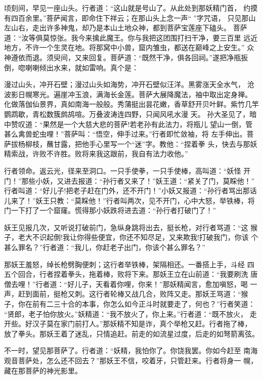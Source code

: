 顷刻间，早见一座山头。行者道：“这山就是号山了。从此处到那妖精门首，
约摸有四百余里。”菩萨闻言，即命住下祥云；在那山头上念一声“”字咒语，
只见那山左山右，走出许多神鬼，却乃是本山土地众神，都到菩萨宝莲座下磕头。
菩萨道：“汝等俱莫惊张。我今来擒此魔王。你与我把这团围打扫干净，要三百里
远近地方，不许一个生灵在地。将那窝中小兽，窟内雏虫，都送在巅峰之上安生。”
众神遵依而退。须臾间，又来回复。菩萨道：“既然干净，俱各回祠。”遂把净瓶扳
倒，唿喇喇倾出水来，就如雷响。真个是：

漫过山头，冲开石壁；漫过山头如海势，冲开石壁似汪洋。黑雾涨天全水气，
沧波影日幌寒光。遍崖冲玉浪，满海长金莲。菩萨大展降魔法，袖中取出定身禅。
化做落伽仙景界，真如南海一般般。秀蒲挺出昙花嫩，香草舒开贝叶鲜。紫竹几竿
鹦鹉歇，青松数簇鹧鸪喧。万叠波涛连四野，只闻风吼水漫
天。
孙大圣见了，暗中赞叹道：“果然是一个大慈大悲的菩萨!若老孙有此法力，将瓶儿
望山一倒，管甚么禽兽蛇虫哩！”菩萨叫：“悟空，伸手过来。”行者即忙敛袖，将
左手伸出。菩萨拔杨柳枝，蘸甘露，把他手心里写一个“迷”字。教他：“捏着拳
头，快去与那妖精索战，许败不许胜。败将来我这跟前，我自有法力收他。”

行者领命。返云光，径来至洞口。一只手使拳，一只手使棒，高叫道：“妖怪
开门！”那些小妖，又进去报道：“孙行者又来了！”妖王道：“紧关了门，莫睬他！”
行者叫道：“好儿子!把老子赶在门外，还不开门！”小妖又报道：“孙行者骂出那话
儿来了！”妖王只教：“莫睬他！”行者叫两次，见不开门，心中大怒，举铁棒，将
门一下打了一个窟窿。慌得那小妖跌将进去道：“孙行者打破门了！”

妖王见报几次，又听说打破前门，急纵身跳将出去，挺长枪，对行者骂道：“这
猴子，老大不识起倒!我让你得些便宜，你还不知尽足，又来欺我!打破我门，你该
个甚么罪名？”行者道：“我儿，你赶老子出门，你该个甚么罪名？”

那妖王羞怒，绰长枪劈胸便刺；这行者举铁棒，架隔相还。一番搭上手，斗经
四五个回合，行者捏着拳头，拖着棒，败将下来。那妖王立在山前道：“我要刷洗
唐僧去哩！”行者道：“好儿子，天看着你哩，你来！”那妖精闻言，愈加嗔怒，喝
一声，赶到面前，挺枪又刺。这行者轮棒又战几合，败阵又走。那妖王骂道：“猴
子，你在前有二三十合的本事，你怎么如今正斗时就要走了，何也？”行者笑道：
“贤郎，老子怕你放火。”妖精道：“我不放火了，你上来。”行者道：“既不放火，
走开些。好汉子莫在家门前打人。”那妖精不知是诈，真个举枪又赶。行者拖了棒，
放了拳头。那妖王着了迷乱，只情追赶。前走的如流星过度，后走的如弩箭离弦。

不一时，望见那菩萨了。行者道：“妖精，我怕你了。你饶我罢。你如今赶至
南海观音菩萨处，怎么还不回去？”那妖王不信，咬着牙，只管赶来。行者将身一
幌，藏在那菩萨的神光影里。


